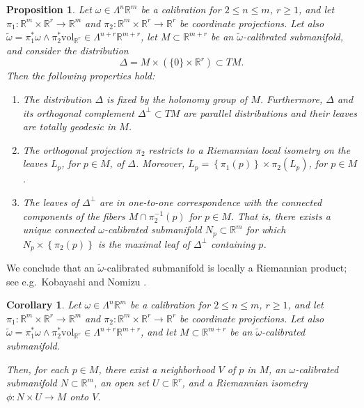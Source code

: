 \documentclass[a4paper,leqno,11pt]{amsart}
\numberwithin{equation}{section}
\newtheorem{corollary}[theorem]{Corollary}
\newtheorem{proposition}[theorem]{Proposition}
\theoremstyle{remark}
\theoremstyle{remark}
\newcommand{\R}{\mathbb{R}}
\newcommand{\vol}{\mathrm{vol}}
\begin{document}
\begin{proposition}
\label{prop:locflat-new}
Let $\omega \in \Lambda^n\R^m$ be a calibration for $2\le n \le m$, $r\ge 1$, and let $\pi_1 \colon \R^m \times \R^r\to \R^m$ and $\pi_2 \colon \R^m \times \R^r \to \R^r$ be coordinate projections. Let also $\widetilde \omega = \pi_1^*\omega\wedge \pi_2^*\vol_{\R^r}\in \Lambda^{n+r} \R^{m+r}$, let $M \subset \R^{m+r}$ be an $\widetilde \omega$-calibrated submanifold, and consider the distribution
\[
\Delta = M \times (\{0\}\times \R^r) \subset TM.
\]
Then the following properties hold:
\begin{enumerate}
\item The distribution $\Delta$ is fixed by the holonomy group of $M$. Furthermore, $\Delta$ and its orthogonal complement $\Delta^\perp \subset TM$ are parallel distributions and their leaves are totally geodesic in $M$. \label{item:localflat-now-1} 
\item The orthogonal projection $\pi_2$ restricts to a Riemannian local isometry on the leaves $L_p$, for $p \in M$, of $\Delta$. Moreover, $L_p = \left\{ \pi_1(p) \right\} \times \pi_2( L_p )$, for $p\in M$.
\label{item:localflat-now-2}
\item The leaves of $\Delta^{\perp}$ are in one-to-one correspondence with the connected components of the fibers $M \cap \pi_2^{-1}(p)$ for $p \in M$. That is, there exists a unique connected $\omega$-calibrated submanifold $N_p \subset \R^m$ for which $N_p \times \left\{ \pi_2(p) \right\}$ is the maximal leaf of $\Delta^{\perp}$ containing $p$. \label{item:localflat-now-3}
\end{enumerate}
\end{proposition}

We conclude that an $\widetilde \omega$-calibrated submanifold is locally a Riemannian product; see e.g.~Kobayashi and Nomizu \cite[Chapter IV, Proposition 5.2.]{Kob:Nom:96}.

\begin{corollary}
\label{cor:locflat-new}
Let $\omega \in \Lambda^n\R^m$ be a calibration for $2\le n \le m$, $r\ge 1$, and let $\pi_1 \colon \R^m \times \R^r\to \R^m$ and $\pi_2 \colon \R^m \times \R^r \to \R^r$ be coordinate projections. Let also $\widetilde \omega = \pi_1^*\omega \wedge \pi_2^*\vol_{\R^r}\in \Lambda^{n+r} \R^{m+r}$, and let $M \subset \R^{m+r}$ be an $\widetilde \omega$-calibrated submanifold. 

Then, for each $p \in M$, there exist a neighborhood $V$ of $p$ in $M$, an $\omega$-calibrated submanifold $N \subset \R^m$, an open set $U \subset \R^r$, and a Riemannian isometry $\phi \colon N \times U \to M$ onto $V$.
\end{corollary}
\end{document}
